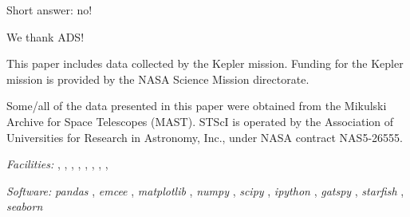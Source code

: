 \documentclass[twocolumn]{emulateapj}%
\newcommand{\project}[1]{\textsl{#1}}
\begin{document}
Short answer: no!

\acknowledgements

We thank ADS!

This paper includes data collected by the Kepler mission. Funding for the Kepler mission is provided by the NASA Science Mission directorate.

Some/all of the data presented in this paper were obtained from the Mikulski Archive for Space Telescopes (MAST). STScI is operated by the Association of Universities for Research in Astronomy, Inc., under NASA contract NAS5-26555.


{\it Facilities:} , , , , , , , , 

{\it Software: }
 \project{pandas} \citep{mckinney10},
 \project{emcee} \citep{foreman13},
 \project{matplotlib} \citep{hunter07},
 \project{numpy} \citep{vanderwalt11},
 \project{scipy} \citep{jones01},
 \project{ipython} \citep{perez07},
 \project{gatspy} \citep{JakeVanderplas2015},
 \project{starfish} \citep{czekala15},
 \project{seaborn} \citep{waskom14}

\clearpage



\end{document}

